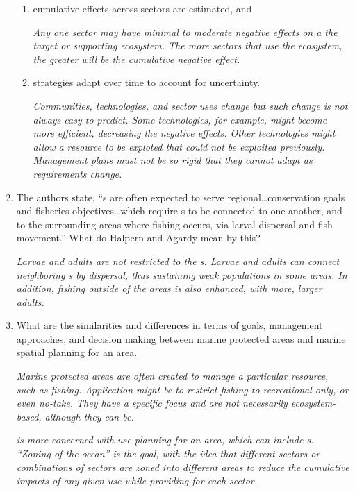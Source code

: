 \documentclass[letterpaper]{tufte-handout}
\begin{document}
\begin{enumerate}
\begin{enumerate}
		\item cumulative effects across sectors are estimated\label{item:cumulative_effects}, and
		
		\textit{Any one sector may have minimal to moderate negative effects on a the target or supporting ecosystem. The more sectors that use the ecosystem, the greater will be the cumulative negative effect. }

		\item strategies adapt over time to account for uncertainty.
		
		\textit{Communities, technologies, and sector uses change but such change is not always easy to predict. Some technologies, for example, might become more efficient, decreasing the negative effects. Other technologies might allow a resource to be exploted that could not be exploited previously. Management plans must not be so rigid that they cannot adapt as requirements change.} 
	\end{enumerate}
	
	\item The authors state, “s are often expected to serve regional\dots conservation goals and fisheries objectives\dots which require s to be connected to one another, and to the surrounding areas where fishing occurs, via larval dispersal and fish movement.” What do Halpern and Agardy mean by this?
	
	\textit{Larvae and adults are not restricted to the s. Larvae and adults can connect neighboring s by dispersal, thus sustaining weak populations in some areas. In addition, fishing outside of the areas is also enhanced, with more, larger adults.}


	\item What are the similarities and differences in terms of goals, management approaches, and decision making between marine protected areas  and marine spatial planning  for an area.
	
	\textit{Marine protected areas are often created to manage a particular resource, such as fishing. Application might be to restrict fishing to recreational-only, or even no-take. They have a specific focus and are not necessarily ecosystem-based, although they can be.}
	
	\textit{ is more concerned with use-planning for an area, which can include s. “Zoning of the ocean” is the goal, with the idea that different sectors or combinations of sectors are zoned into different areas to reduce the cumulative impacts of any given use while providing for each sector.}
	

\end{enumerate}
\end{document}
